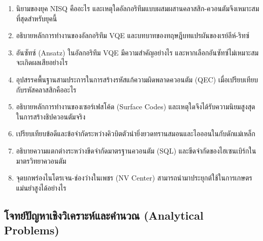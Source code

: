 \begin{enumerate}[label=\textbf{\arabic*.}]
    \item นิยามของยุค NISQ คืออะไร และเหตุใดอัลกอริทึมแบบผสมผสานคลาสสิก-ควอนตัมจึงเหมาะสมที่สุดสำหรับยุคนี้
    \item อธิบายหลักการทำงานของอัลกอริทึม VQE และบทบาทของทฤษฎีบทแปรผันของเรย์ลีห์-ริทซ์
    \item อันซัทซ์ (Ansatz) ในอัลกอริทึม VQE มีความสำคัญอย่างไร และหากเลือกอันซัทซ์ไม่เหมาะสมจะเกิดผลเสียอย่างไร
    \item อุปสรรคพื้นฐานสามประการในการสร้างรหัสแก้ความผิดพลาดควอนตัม (QEC) เมื่อเปรียบเทียบกับรหัสคลาสสิกคืออะไร
    \item อธิบายหลักการทำงานของเซอร์เฟสโค้ด (Surface Codes) และเหตุใดจึงได้รับความนิยมสูงสุดในการสร้างชิปควอนตัมจริง
    \item เปรียบเทียบข้อดีและข้อจำกัดระหว่างคิวบิตตัวนำยิ่งยวดทรานสมอนและไอออนในกับดักแม่เหล็ก
    \item อธิบายความแตกต่างระหว่างขีดจำกัดมาตรฐานควอนตัม (SQL) และขีดจำกัดของไฮเซนเบิร์กในมาตรวิทยาควอนตัม
    \item จุดบกพร่องไนโตรเจน-ช่องว่างในเพชร (NV Center) สามารถนำมาประยุกต์ใช้ในการเกษตรแม่นยำสูงได้อย่างไร
\end{enumerate}

\subsection*{โจทย์ปัญหาเชิงวิเคราะห์และคำนวณ (Analytical Problems)}

